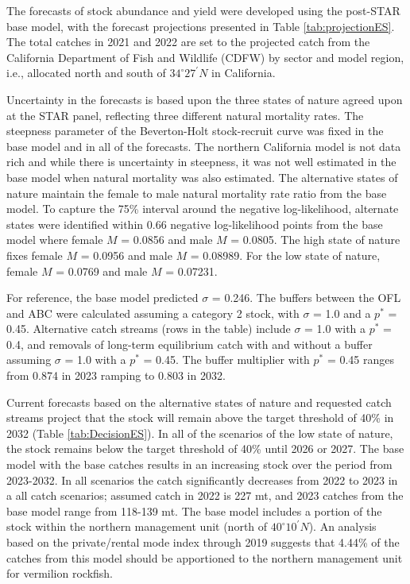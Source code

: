 \documentclass[
  english,
  a4paper,
]{article}
\begin{document}
The forecasts of stock abundance and yield were developed using the post-STAR
base model, with the forecast projections presented in
Table \ref{tab:projectionES}. The total catches in 2021 and 2022 are set to
the projected catch from the California Department of Fish and Wildlife (CDFW) by
sector and model region, i.e., allocated north and south of $34^\circ 27^\prime N$ in California.

Uncertainty in the forecasts is based upon the three states of nature agreed upon
at the STAR panel, reflecting three different natural mortality rates. The steepness
parameter of the Beverton-Holt stock-recruit curve was fixed in the base model
and in all of the forecasts. The northern California model is not data rich and
while there is uncertainty in steepness, it was not well estimated in the base
model when natural mortality was also estimated. The alternative states of nature
maintain the
female to male natural mortality rate ratio from the base model. To capture the
75\% interval around the negative log-likelihood, alternate states were identified
within 0.66 negative log-likelihood points from the base model where female
\(M\) = 0.0856 and male \(M\) = 0.0805.
The high state of nature fixes female \(M\) = 0.0956 and male \(M\) = 0.08989.
For the low state of nature, female \(M\) = 0.0769 and male \(M\) = 0.07231.

For reference, the base model predicted \(\sigma\) = 0.246. The buffers between the OFL and ABC were calculated assuming a category 2 stock, with \(\sigma\) = 1.0
and a \(p^*\) = 0.45. Alternative catch streams (rows in the table) include \(\sigma\) = 1.0
with a \(p^*\) = 0.4, and removals of long-term equilibrium catch with and without a buffer assuming \(\sigma\) = 1.0 with a \(p^*\) = 0.45. The buffer multiplier with \(p^*\) = 0.45 ranges from 0.874 in 2023 ramping to 0.803 in 2032.

Current forecasts based on the alternative states of nature and requested catch streams project that the stock will remain above the target threshold of 40\% in 2032 (Table \ref{tab:DecisionES}). In all of the scenarios of the low state of nature, the stock remains below the
target threshold of 40\% until 2026 or 2027.
The base model with the base catches results in an increasing stock over the period from
2023-2032. In all scenarios the catch significantly decreases from 2022 to 2023 in a
all catch scenarios; assumed catch in 2022 is 227 mt, and 2023 catches from the base
model range from 118-139 mt. The base model includes a portion of the stock within
the northern management unit (north of $40^\circ 10^\prime N$). An analysis based on the private/rental
mode index through 2019 suggests
that 4.44\% of the catches from this model should be apportioned to the northern
management unit for vermilion rockfish.
\end{document}
